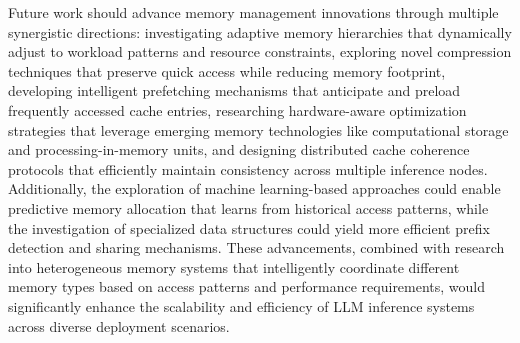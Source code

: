 Future work should advance memory management innovations through multiple synergistic directions: investigating adaptive memory hierarchies that dynamically adjust to workload patterns and resource constraints, exploring novel compression techniques that preserve quick access while reducing memory footprint, developing intelligent prefetching mechanisms that anticipate and preload frequently accessed cache entries, researching hardware-aware optimization strategies that leverage emerging memory technologies like computational storage and processing-in-memory units, and designing distributed cache coherence protocols that efficiently maintain consistency across multiple inference nodes. Additionally, the exploration of machine learning-based approaches could enable predictive memory allocation that learns from historical access patterns, while the investigation of specialized data structures could yield more efficient prefix detection and sharing mechanisms. These advancements, combined with research into heterogeneous memory systems that intelligently coordinate different memory types based on access patterns and performance requirements, would significantly enhance the scalability and efficiency of LLM inference systems across diverse deployment scenarios.

